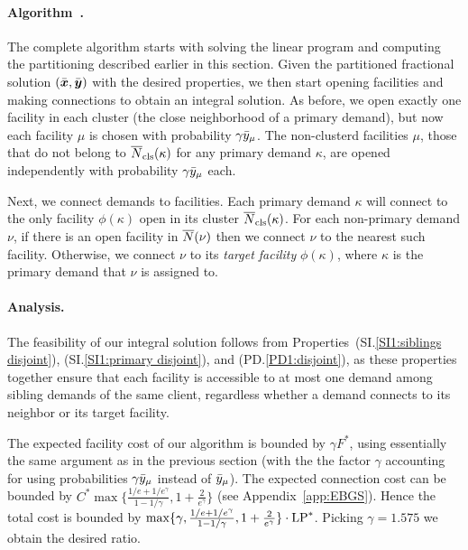 \documentclass{llncs}
\begin{document}

\paragraph{Algorithm~{\EBGS}.}
The complete algorithm starts with solving the linear program and
computing the partitioning described earlier in this section.
Given the partitioned fractional solution $(\bar{\boldsymbol{x}},
\bar{\boldsymbol{y}})$ with the desired properties, we then start opening
facilities and making connections to obtain an integral
solution. As before, we open exactly one facility in each
cluster (the close neighborhood of a primary demand), but
now each facility $\mu$ is chosen with probability
$\gamma{\bar y}_{\mu}$. The non-clusterd facilities $\mu$,
those that do not belong to ${\overline{N}}_{\text{cls}}(\kappa)$ for any
primary demand $\kappa$, are opened independently with
probability $\gamma{\bar y}_{\mu}$ each. 

Next, we connect demands to facilities.  Each primary demand $\kappa$
will connect to the only facility $\phi(\kappa)$ open in its cluster
${\overline{N}}_{\text{cls}}(\kappa)$.  For each non-primary demand $\nu$, if there is
an open facility in ${\overline{N}}(\nu)$ then we connect $\nu$ to the nearest
such facility. Otherwise, we connect $\nu$ to its \emph{target
  facility} $\phi(\kappa)$, where $\kappa$ is the primary demand that
$\nu$ is assigned to.


\paragraph{Analysis.}
The feasibility of our integral solution follows from
Properties~(SI.\ref{SI1:siblings disjoint}), (SI.\ref{SI1:primary
  disjoint}), and (PD.\ref{PD1:disjoint}), as these properties together
ensure that each facility is accessible to at most one demand among
sibling demands of the same client, regardless whether a demand
connects to its neighbor or its target facility.

The expected facility cost of our algorithm is bounded by $\gamma
F^\ast$, using essentially the same argument as in the previous
section (with the the factor $\gamma$ accounting for using
probabilities $\gamma {\bar y}_{\mu}$ instead of ${\bar y}_{\mu}$). The
expected connection cost can be bounded by $C^\ast
\max\{\frac{1/e+1/e^\gamma}{1-1/\gamma}, 1+\frac{2}{e^\gamma}\}$ (see
Appendix~\ref{app:EBGS}).  Hence the total cost is bounded by
$\max\{\gamma, \frac{1/e+1/e^\gamma}{1-1/\gamma},
1+\frac{2}{e^\gamma}\}\cdot \mbox{\rm LP}^\ast$. Picking $\gamma=1.575$ we
obtain the desired ratio.
\end{document}
